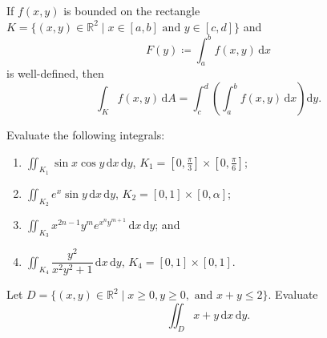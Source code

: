 \documentclass[11pt]{article}
\theoremstyle{break}
\theoremstyle{no_label}
\newcommand{\dd}{\text{d}}
\newcommand{\ddi}{\text{$\,$d}}
\newcommand{\bbR}{\mathbb{R}}
\numberwithin{equation}{theorem}
\begin{document}
\begin{theorem}
    If $f(x, y)$ is bounded on the rectangle $K=\{(x, y)\in\bbR^2\mid x\in[a, b]\text{\ and\ }y\in[c,d ]\}$ and $$F(y)\coloneq\int_a^b f(x, y)\ddi x$$ is well-defined, then $$\int_K f(x, y)\ddi A=\int_c^d\left(\int_a^b f(x, y)\ddi x\right)\dd y.$$
\end{theorem}

\begin{example}
    Evaluate the following integrals:
    \begin{enumerate}
        \item $\displaystyle\iint_{K_1}\sin x\cos y\ddi x\ddi y$, $K_1=[0, \frac{\pi}{3}]\times[0, \frac{\pi}{6}]$;
        \item $\displaystyle\iint_{K_2}e^x\sin y\ddi x\ddi y$, $K_2=[0, 1]\times[0, \alpha]$;
        \item $\displaystyle\iint_{K_3}x^{2n-1}y^me^{x^ny^{m+1}}\ddi x\ddi y$; and
        \item $\displaystyle\iint_{K_4}\dfrac{y^2}{x^2y^2+1}\ddi x\ddi y$, $K_4=[0, 1]\times[0, 1]$.
    \end{enumerate}
\end{example}


\begin{example}
    Let $D=\{(x, y)\in\bbR^2\mid x\geq 0, y\geq 0,\text{\ and\ }x+y\leq 2\}$. Evaluate $$\iint_D x+y\ddi x\ddi y.$$
\end{example}
\end{document}
